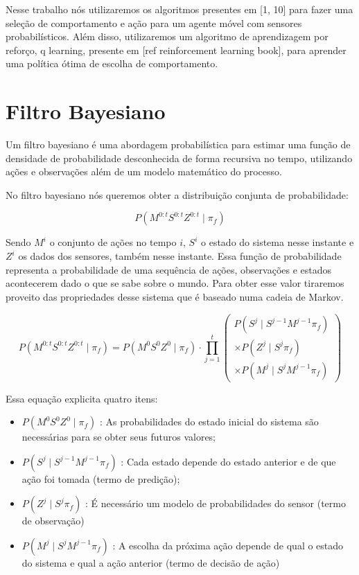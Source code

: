 Nesse trabalho nós utilizaremos os algoritmos presentes em [1, 10] para fazer uma seleção de comportamento e ação para um agente móvel com sensores probabilísticos. Além disso, utilizaremos um algoritmo de aprendizagem por reforço, q learning, presente em [ref reinforcement learning book], para aprender uma política ótima de escolha de comportamento.


\section{Filtro Bayesiano}

Um filtro bayesiano é uma abordagem probabilística para estimar uma função de densidade de probabilidade desconhecida de forma recursiva no tempo, utilizando ações e observações além de um modelo matemático do processo.

No filtro bayesiano nós queremos obter a distribuição conjunta de probabilidade:

\begin{equation}
P ( M^{0: t} S^{0: t} Z^{0: t} \mid \pi_f )
\end{equation}

Sendo $ M^i $ o conjunto de ações no tempo $ i $, $ S^i $ o estado do sistema nesse instante e $ Z^i $ os dados dos sensores, também nesse instante. Essa função de probabilidade representa a probabilidade de uma sequência de ações, observações e estados acontecerem dado o que se sabe sobre o mundo. Para obter esse valor tiraremos proveito das propriedades desse sistema que é baseado numa cadeia de Markov.

\begin{equation}
        P ( M^{0: t} S^{0: t} Z^{0: t} \mid \pi_f ) = P ( M^0 S^0 Z^0 \mid \pi_f ) \cdot \prod\limits_{j =1}^{t} 
        \left(
            \begin{array}{l}
                P( S^j \mid S^{j -1} M^{j -1} \pi_f ) \\
                \times P( Z^j \mid S^j \pi_f ) \\
                \times P( M^j \mid S^j M^{j -1} \pi_f )
            \end{array}
        \right)
\end{equation}

Essa equação explicita quatro itens:

\begin{itemize}
  \item $ P \left( M^0 S^0 Z^0 \mid \pi_f \right) $ : As probabilidades do estado inicial do sistema são necessárias para se obter seus futuros valores;
  \item $ P \left( S^j \mid S^{j-1} M^{j-1} \pi_f \right) $ : Cada estado depende do estado anterior e de que ação foi tomada (termo de predição);
  \item $ P \left( Z^j \mid S^j \pi_f \right) $ : É necessário um modelo de probabilidades do sensor (termo de observação)
  \item $ P \left( M^j \mid S^j M^{j-1} \pi_f \right) $ : A escolha da próxima ação depende de qual o estado do sistema e qual a ação anterior (termo de decisão de ação)
\end{itemize}

